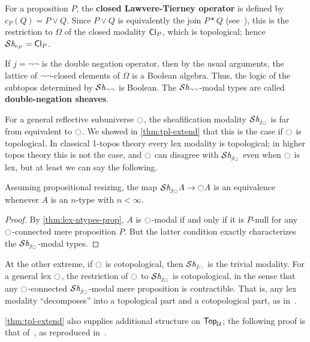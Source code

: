 \begin{eg}
  For a proposition $P$, the \textbf{closed Lawvere-Tierney operator} is defined by $c_P(Q) = P\lor Q$.
  Since $P \lor Q$ is equivalently the join $P \ast Q$ (see~\cite[Lemma 2.4]{joinconstruction}), this is the restriction to $\Omega$ of the closed modality $\mathsf{Cl}_{P}$, which is topological; hence $\mathcal{S}\mathit{h}_{c_P} = \mathsf{Cl}_{P}$.
\end{eg}

\begin{eg}\label{eg:dnsheaves}
  If $j = \neg\neg$ is the double negation operator, then by the usual arguments, the lattice of $\neg\neg$-closed elements of $\Omega$ is a Boolean algebra.
  Thus, the logic of the subtopos determined by $\mathcal{S}\mathit{h}_{\neg\neg}$ is Boolean.
  The $\mathcal{S}\mathit{h}_{\neg\neg}$-modal types are called \textbf{double-negation sheaves}.
\end{eg}

For a general reflective subuniverse ${\ocircle}$, the sheafification modality $\mathcal{S}\mathit{h}_{j_{\ocircle}}$ is far from equivalent to ${\ocircle}$.
We showed in \cref{thm:tpl-extend} that this is the case if ${\ocircle}$ is topological.
In classical 1-topos theory every lex modality is topological; in higher topos theory this is not the case, and ${\ocircle}$ can disagree with $\mathcal{S}\mathit{h}_{j_{\ocircle}}$ even when ${\ocircle}$ is lex, but at least we can say the following.

\begin{thm}\label{thm:lex-tpl}
  Assuming propositional resizing, the map $\mathcal{S}\mathit{h}_{j_{\ocircle}} A \to {\ensuremath{\ocircle}} A$ is an equivalence whenever $A$ is an $n$-type with $n<\infty$.
\end{thm}
\begin{proof}
  By \cref{thm:lex-ntypes-prop}, $A$ is ${\ocircle}$-modal if and only if it is $P$-null for any ${\ocircle}$-connected mere proposition $P$.
  But the latter condition exactly characterizes the $\mathcal{S}\mathit{h}_{j_{\ocircle}}$-modal types.
\end{proof}

At the other extreme, if ${\ocircle}$ is cotopological, then $\mathcal{S}\mathit{h}_{j_{\ocircle}}$ is the trivial modality.
For a general lex ${\ocircle}$, the restriction of ${\ocircle}$ to $\mathcal{S}\mathit{h}_{j_{\ocircle}}$ is cotopological, in the sense that any ${\ocircle}$-connected $\mathcal{S}\mathit{h}_{j_{\ocircle}}$-modal mere proposition is contractible.
That is, any lex modality ``decomposes'' into a topological part and a cotopological part, as in~\cite[Proposition 6.5.2.19]{Lurie09}.

\cref{thm:tpl-extend} also supplies additional structure on $\mathsf{Top}_{\mathcal{U}}$; the following proof is that of~\cite{wilson:frames}, as reproduced in~\cite[C1.1.15]{johnstone:elephant}.

